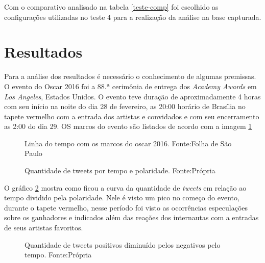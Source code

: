 Com o comparativo analisado na tabela \ref{teste-comp} foi escolhido as configurações utilizadas no teste 4 para a realização da análise na base capturada.

\section{Resultados}\label{result}

Para a análise dos resultados é necessário o conhecimento de algumas premissas. O evento do Oscar 2016 foi a  88.ª cerimônia de entrega dos \textit{Academy Awards} em \textit{Los Angeles}, Estados Unidos. O evento teve duração de aproximadamente 4 horas com seu início na noite do dia 28 de fevereiro, as 20:00 horário de Brasília no tapete vermelho com a entrada dos artistas e convidados e  com seu encerramento as 2:00 do dia 29. OS marcos do evento são listados de acordo com a imagem \ref{time}

\begin{figure}[!h]
	\centering{}
	\caption{Linha do tempo com os marcos do oscar 2016. Fonte:Folha de São Paulo}
	\label{time}
\end{figure}

\begin{figure}[!h]
	\centering{}
	\caption{Quantidade de tweets por tempo e polaridade. Fonte:Própria}
	\label{qtd}
\end{figure}
O gráfico \ref{qtd} mostra como ficou a curva da quantidade de \textit{tweets} em relação ao tempo  dividido pela polaridade. Nele é visto um pico  no começo do evento, durante o tapete vermelho, nesse período foi visto as ocorrências  especulações sobre os ganhadores e indicados além das reações dos internautas com a entradas de seus artistas favoritos.

\begin{figure}[!h]
	\centering{}
	\caption{Quantidade de tweets positivos diminuído pelos negativos pelo tempo. Fonte:Própria}
	\label{qtdnegpos}
\end{figure}

